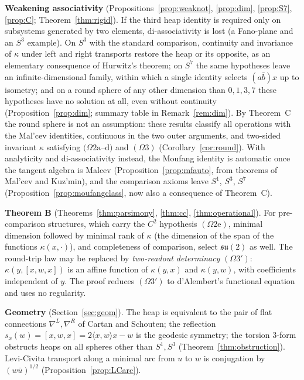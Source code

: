 \documentclass[11pt,reqno]{amsart}
\theoremstyle{definition}
\theoremstyle{remark}
\numberwithin{equation}{section}
\newcommand{\su}{\mathfrak{su}}
\newcommand{\ip}[2]{\langle #1,#2\rangle}
\newcommand{\hp}[3]{[#1,#2,#3]}
\begin{document}
\noindent\textbf{Weakening associativity} (Propositions~\ref{prop:weaknot}, \ref{prop:dim}, \ref{prop:S7}, \ref{prop:C}; Theorem~\ref{thm:rigid}).  If the
third heap identity is required only on subsystems generated by two elements, di-associativity is lost (a Fano-plane and
an $S^3$ example).  On $S^3$ with the standard comparison, continuity and invariance of $\kappa$ under left and right transports
restore the heap or its opposite, as an elementary consequence of Hurwitz's theorem; on $S^7$ the same hypotheses leave an
infinite-dimensional family, within which a single identity selects $(a\bar b)x$ up to isometry; and on a round sphere of any other
dimension than $0,1,3,7$ these hypotheses have no solution at all, even without continuity (Proposition~\ref{prop:dim}; summary table in Remark~\ref{rem:dim}).
By Theorem~C the round sphere is not an assumption: these results classify all operations with the Mal'cev identities,
continuous in the two outer arguments, and two-sided invariant $\kappa$ satisfying $(\Omega2\mathrm a$--$\mathrm d)$ and $(\Omega3)$ (Corollary~\ref{cor:round}).  With analyticity and
di-associativity instead, the Moufang identity is automatic once the tangent algebra is Malcev (Proposition~\ref{prop:mfauto}, from
theorems of Mal'cev and Kuz'min), and the comparison axioms leave $S^1$, $S^3$, $S^7$ (Proposition~\ref{prop:moufangclass}, now also a
consequence of Theorem~C).

\noindent\textbf{Theorem B} (Theorems~\ref{thm:parsimony}, \ref{thm:cc}, \ref{thm:operational}).  For pre-comparison
structures, which carry the $C^2$ hypothesis $(\Omega2\mathrm e)$, minimal dimension followed by minimal rank of $\kappa$ (the
dimension of the span of the functions $\kappa(x,\cdot)$), and completeness of comparison, select $\su(2)$ as well.  The round-trip law may be
replaced by \emph{two-readout determinacy} $(\Omega3')$: $\kappa(y,\hp xwx)$ is an affine function of $\kappa(y,x)$ and
$\kappa(y,w)$, with coefficients independent of $y$.  The proof reduces $(\Omega3')$ to d'Alembert's functional equation and uses no regularity.

\noindent\textbf{Geometry} (Section~\ref{sec:geom}).  The heap is equivalent to the pair of flat
connections $\nabla^L,\nabla^R$ of Cartan and Schouten; the reflection $s_x(w)=\hp xwx=2\ip xwx-w$ is the
geodesic symmetry; the torsion $3$-form obstructs heaps on all spheres other than $S^1,S^3$
(Theorem~\ref{thm:obstruction}).  Levi-Civita transport along a minimal arc from $u$ to $w$ is conjugation
by $(w\bar u)^{1/2}$ (Proposition~\ref{prop:LCarc}).
\end{document}
